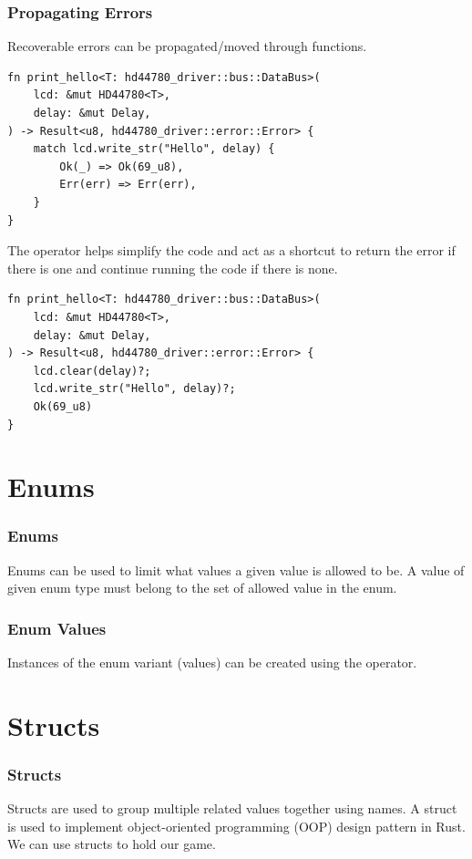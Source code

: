 \documentclass{beamer}
\begin{document}
\begin{frame}
  \frametitle{Propagating Errors}
  Recoverable errors can be propagated/moved through functions.

\begin{lstlisting}
fn print_hello<T: hd44780_driver::bus::DataBus>(
    lcd: &mut HD44780<T>,
    delay: &mut Delay,
) -> Result<u8, hd44780_driver::error::Error> {
    match lcd.write_str("Hello", delay) {
        Ok(_) => Ok(69_u8),
        Err(err) => Err(err),
    }
}
\end{lstlisting}

  \pagebreak

  The  operator helps simplify the code and act as a shortcut to return the error if there is one and continue running the code if there is none.

\begin{lstlisting}
fn print_hello<T: hd44780_driver::bus::DataBus>(
    lcd: &mut HD44780<T>,
    delay: &mut Delay,
) -> Result<u8, hd44780_driver::error::Error> {
    lcd.clear(delay)?;
    lcd.write_str("Hello", delay)?;
    Ok(69_u8)
}
\end{lstlisting}
\end{frame}

\section{Enums}
\begin{frame}[fragile]
  \frametitle{Enums}
  Enums can be used to limit what values a given value is allowed to be. A value of given enum type must belong to the set of allowed value in the enum.

  
\end{frame}

\begin{frame}[fragile]
  \frametitle{Enum Values}
  Instances of the enum variant (values) can be created using the \inlinecode{::} operator.

  
\end{frame}

\section{Structs}
\begin{frame}
  \frametitle{Structs}
  Structs are used to group multiple related values together using names. A struct is used to implement object-oriented programming (OOP) design pattern in Rust. We can use structs to hold our game.
  
\end{frame}
\end{document}
